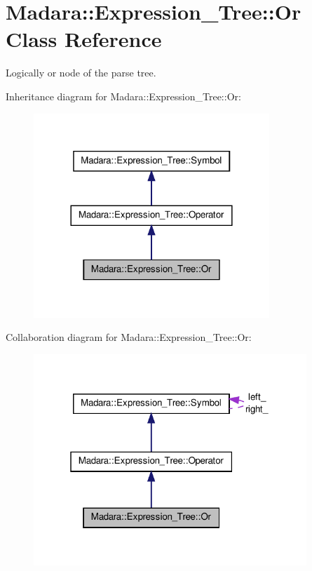 \hypertarget{classMadara_1_1Expression__Tree_1_1Or}{
\section{Madara::Expression\_\-Tree::Or Class Reference}
\label{d8/d1f/classMadara_1_1Expression__Tree_1_1Or}
}


Logically or node of the parse tree.  




Inheritance diagram for Madara::Expression\_\-Tree::Or:
\nopagebreak
\begin{figure}[H]
\begin{center}
\leavevmode
\includegraphics[width=252pt]{d5/d6c/classMadara_1_1Expression__Tree_1_1Or__inherit__graph}
\end{center}
\end{figure}


Collaboration diagram for Madara::Expression\_\-Tree::Or:
\nopagebreak
\begin{figure}[H]
\begin{center}
\leavevmode
\includegraphics[width=292pt]{d3/da2/classMadara_1_1Expression__Tree_1_1Or__coll__graph}
\end{center}
\end{figure}
